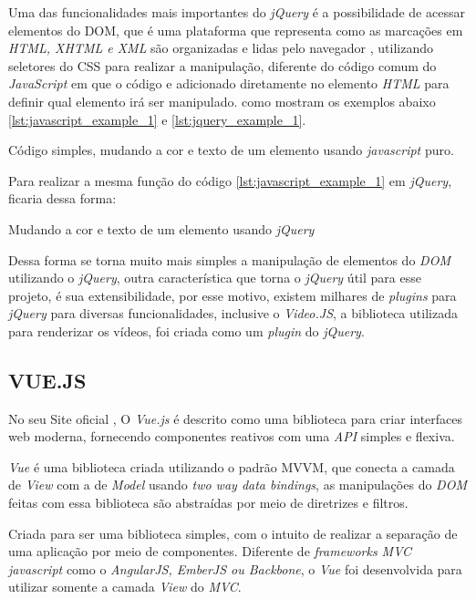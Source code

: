 Uma das funcionalidades mais importantes do \textit{jQuery} é a possibilidade de acessar elementos do \ac{DOM}, que é uma plataforma que representa como as marcações em \textit{HTML, XHTML e XML} são organizadas e lidas pelo navegador \cite{franklin-dom}, utilizando seletores do \ac{CSS} para realizar a manipulação, diferente do código comum do \textit{JavaScript} em que o código e adicionado diretamente no elemento \textit{HTML} para definir qual elemento irá ser manipulado. como mostram os exemplos abaixo \ref{lst:javascript_example_1} e \ref{lst:jquery_example_1}.
\begin{listing}[H]
    \caption{Código simples, mudando a cor e texto de um elemento usando \textit{javascript} puro.}
    \label{lst:javascript_example_1}
\end{listing}
Para realizar a mesma função do código \ref{lst:javascript_example_1} em \textit{jQuery}, ficaria dessa forma:
\begin{listing}[H]
      \caption{Mudando a cor e texto de um elemento usando \textit{jQuery}}
      \label{lst:jquery_example_1}
\end{listing}

Dessa forma se torna muito mais simples a manipulação de elementos do \textit{DOM} utilizando o \textit{jQuery}, outra característica que torna o \textit{jQuery} útil para esse projeto, é sua extensibilidade, por esse motivo, existem milhares de \textit{plugins} para \textit{jQuery} para diversas funcionalidades, inclusive o \textit{Video.JS}, a biblioteca utilizada para renderizar os vídeos, foi criada como um \textit{plugin} do \textit{jQuery}.

\subsection{VUE.JS}

No seu Site oficial , O \textit{Vue.js} é descrito como uma biblioteca para criar interfaces web moderna, fornecendo componentes reativos com uma \textit{API} simples e flexiva.

\textit{Vue} é uma biblioteca criada utilizando o padrão \ac{MVVM}, que conecta a camada de \textit{View} com a de \textit{Model} usando \textit{two way data bindings}, as manipulações do \textit{DOM} feitas com essa biblioteca são abstraídas por meio de diretrizes e filtros.

Criada para ser uma biblioteca simples, com o intuito de realizar a separação de uma aplicação por meio de componentes. Diferente de \textit{frameworks MVC javascript} como o \textit{AngularJS, EmberJS ou Backbone}, o \textit{Vue} foi desenvolvida para utilizar somente a camada \textit{View} do \textit{MVC}.


